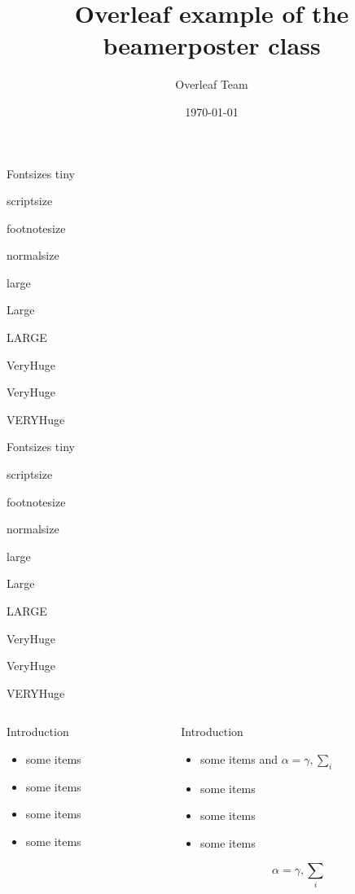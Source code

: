 \documentclass{beamer}
\title[Beamer Poster]{Overleaf example of the beamerposter class}
\author[welcome@overleaf.com]{Overleaf Team}
\institute[Overleaf University]
  {The Overleaf institute, Learn faculty}
\date{\today}
\begin{document}
\begin{frame}{}
	\vfill
	\begin{block}{\large Fontsizes}
		\centering
		{\tiny tiny}\par
		{\scriptsize scriptsize}\par
		{\footnotesize footnotesize}\par
		{\normalsize normalsize}\par
		{\large large}\par
		{\Large Large}\par
		{\LARGE LARGE}\par
		{\veryHuge VeryHuge}\par
		{\VeryHuge VeryHuge}\par
		{\VERYHuge VERYHuge}\par
	\end{block}
	\vfill
	\vfill
	\begin{block}{\large Fontsizes}
		\centering
		{\tiny tiny}\par
		{\scriptsize scriptsize}\par
		{\footnotesize footnotesize}\par
		{\normalsize normalsize}\par
		{\large large}\par
		{\Large Large}\par
		{\LARGE LARGE}\par
		{\veryHuge VeryHuge}\par
		{\VeryHuge VeryHuge}\par
		{\VERYHuge VERYHuge}\par
	\end{block}
	\vfill
	\begin{columns}[t]
		\begin{column}{.30\linewidth}
			\begin{block}{Introduction}
				\begin{itemize}
					\item some items
					\item some items
					\item some items
					\item some items
				\end{itemize}
			\end{block}
		\end{column}
		\begin{column}{.48\linewidth}
			\begin{block}{Introduction}
				\begin{itemize}
					\item some items and $\alpha=\gamma, \sum_{i}$
					\item some items
					\item some items
					\item some items
				\end{itemize}
				$$\alpha=\gamma, \sum_{i}$$
			\end{block}


\end{column}
\end{columns}
\end{frame}
\end{document}

